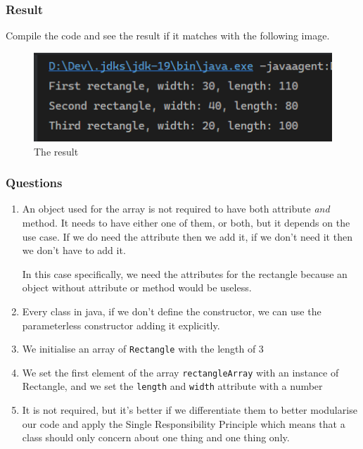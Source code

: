 \documentclass[12pt,titlepage]{article}
\begin{document}
\newpage

\subsubsection{Result}
Compile the code and see the result if it matches with the following image.

\begin{figure}[h]
    \centering
    \includegraphics[width=12cm]{./images/array-of-objects.png}
    \caption{The result}
\end{figure}

\subsubsection{Questions}
\begin{enumerate}
    \item {
        An object used for the array is not required to have both attribute \textit{and} method.
        It needs to have either one of them, or both, but it depends on the use case. If we do need the attribute then we add it,
        if we don't need it then we don't have to add it.

        In this case specifically, we need the attributes for the rectangle because an object without attribute or method would be useless.
    }
    \item {
        Every class in java, if we don't define the constructor, we can use the parameterless constructor adding it explicitly.
    }
    \item {
        We initialise an array of \texttt{Rectangle} with the length of 3
    }
    \item {
        We set the first element of the array \texttt{rectangleArray} with an instance of Rectangle,
        and we set the \texttt{length} and \texttt{width} attribute with a number
    }
    \item {
        It is not required, but it's better if we differentiate them to better modularise our code
        and apply the Single Responsibility Principle which means that a class should only concern about one thing
        and one thing only.
    }
\end{enumerate}
\end{document}
